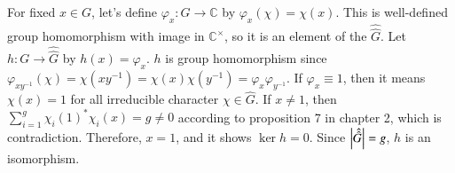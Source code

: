 \documentclass[a4paper, 12pt]{article}
\theoremstyle{Mydefinition}
\theoremstyle{Mytheorem}
\begin{document}
For fixed $x\in G$, let's define $\varphi_x:\hat{G}\rightarrow \mathbb{C}$ by $\varphi_x(\chi) = \chi(x)$. This is well-defined group homomorphism with image in $\mathbb{C}^\times$, so it is an element of the $\hat{\hat{G}}$. Let $h:G\rightarrow \hat{\hat{G}}$ by $h(x) = \varphi_x$. $h$ is group homomorphism since $\varphi_{xy^{-1}}(\chi) = \chi(xy^{-1}) = \chi(x)\chi(y^{-1}) = \varphi_x\varphi_{y^{-1}}$. If $\varphi_x \equiv 1$, then it means $\chi(x) = 1$ for all irreducible character $\chi\in \hat{G}$. If $x\neq 1$, then $\sum_{i=1}^g\chi_i(1)^*\chi_i(x) = g\neq 0$ according to proposition 7 in chapter 2, which is contradiction. Therefore, $x=1$, and it shows $\ker h = 0$. Since $\abs{\hat{\hat{G}}}=g$, $h$ is an isomorphism.
\end{document}
